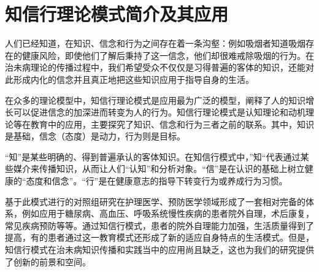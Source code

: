 \section{知信行理论模式简介及其应用}
人们已经知道，在知识、信念和行为之间存在着一条沟壑：例如吸烟者知道吸烟存在的健康风险，即使他们了解后秉持了这一信念，他们却很难戒除吸烟的行为。在治未病理论的传播过程中，我们希望受众不仅仅是习得普遍的客体的知识，还能对此形成内化的信念并且真正地把这些知识应用于指导自身的生活。

在众多的理论模型中，知信行理论模式是应用最为广泛的模型，阐释了人的知识增长可以促进信念的加深进而转变为人的行为。知信行理论模式是认知理论和动机理论等在教育中的应用，主要探究了知识、信念和行为三者之前的联系。其中，知识是基础，信念（态度）是动力，行为则是目标。\cite{黄敬亨2006健康教育学}

“知”是某些明确的、得到普遍承认的客体知识。在知信行模式中，”知“代表通过某些媒介来传播知识，从而让人们“认知”和分析对象。“信”是在认识的基础上树立健康的“态度和信念”。“行”是在健康意志的指导下转变行为或养成行为习惯。\cite{金新政2003}

基于此模式进行的对照组研究在护理医学、预防医学领域形成了一套相对完备的体系，例如应用于糖尿病、高血压、呼吸系统慢性疾病的患者院外自理，术后康复，常见疾病预防等等。通过知信行模式，患者的院外自理能力加强，生活质量得到了提高，有的患者通过这一教育模式还形成了新的适应自身特点的生活模式。但是，知信行模式在治未病知识传播和实践当中的应用尚且缺乏，这也为我们的研究提供了创新的前景和空间。